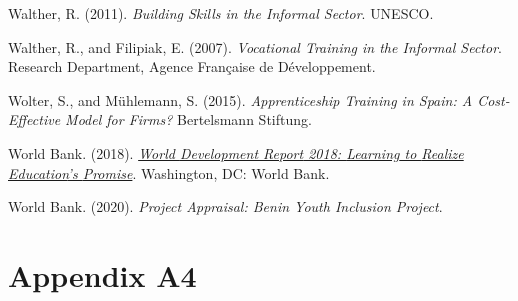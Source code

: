 \documentclass[
  11pt,
a4paper
]{report}
\newlength{\cslhangindent}
\newenvironment{CSLReferences}[2] %
 {%
  \setlength{\parindent}{0pt}
  \ifodd #1 \everypar{\setlength{\hangindent}{\cslhangindent}}\ignorespaces\fi
  \ifnum #2 > 0
  \setlength{\parskip}{#2\baselineskip}
  \fi
 }%
 {}
\begin{document}
\begin{CSLReferences}{1}{0}
\leavevmode{}%
Walther, R. (2011). \emph{Building {Skills} in the {Informal Sector}}. {UNESCO}.

\leavevmode{}%
Walther, R., and Filipiak, E. (2007). \emph{Vocational {Training} in the {Informal Sector}}. {Research Department, Agence Française de Développement}.

\leavevmode{}%
Wolter, S., and Mühlemann, S. (2015). \emph{Apprenticeship {Training} in {Spain}: {A Cost-Effective Model} for {Firms}?} {Bertelsmann Stiftung}.

\leavevmode{}%
World Bank. (2018). \emph{\href{https://doi.org/10.1596/978-1-4648-1096-1}{World {Development Report} 2018: {Learning} to {Realize Education}'s {Promise}}}. {Washington, DC: World Bank}.

\leavevmode{}%
World Bank. (2020). \emph{Project {Appraisal}: {Benin Youth Inclusion Project}}.

\end{CSLReferences}

\clearpage

\hypertarget{cqp-appendix-a}{%
\section*{Appendix A4}\label{cqp-appendix-a}}

\setcounter{figure}{0}
\renewcommand{\thefigure}{A4.\arabic{figure}}
\setcounter{table}{0}
\renewcommand{\thetable}{A4.\arabic{table}}
\end{document}

